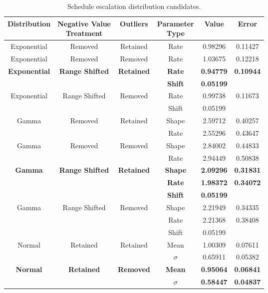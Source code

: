 \documentclass{article}
\begin{document}
\begin{adjustwidth}{-1cm}{-1cm}
\begin{center}
\begin{table}[!htbp]
\caption{Schedule escalation distribution candidates.} \vspace{3 mm}
\begin{tabular} {| c | c | c | c | c | c |} \hline
  Distribution & \makecell{Negative Value \\ Treatment} & Outliers & \makecell{Parameter \\ Type} & Value & Error \\  \hline
  Exponential & Removed & Retained & Rate & 0.98296 & 0.11427 \\ \hline
  Exponential & Removed & Removed & Rate & 1.03675 & 0.12218 \\ \hline
  \textbf{Exponential} & \textbf{Range Shifted} & \textbf{Retained} & \textbf{Rate} & \textbf{0.94779} & \textbf{0.10944} \\ \hline
   & & & \textbf{Shift} & \textbf{0.05199} & \\ \hline
  Exponential & Range Shifted & Removed & Rate & 0.99738 & 0.11673 \\ \hline
   & & & Shift & 0.05199 & \\ \hline
  Gamma & Removed & Retained & Shape & 2.59712 & 0.40257 \\ \hline
   & & & Rate & 2.55296 & 0.43647 \\ \hline
  Gamma & Removed & Removed & Shape & 2.84002 & 0.44833 \\ \hline
   & & & Rate & 2.94449 & 0.50838 \\ \hline
  \textbf{Gamma} & \textbf{Range Shifted} & \textbf{Retained} & \textbf{Shape} & \textbf{2.09296} & \textbf{0.31831} \\ \hline
   & & & \textbf{Rate} & \textbf{1.98372} & \textbf{0.34072} \\ \hline
   & & & \textbf{Shift} & \textbf{0.05199} & \\ \hline
  Gamma & Range Shifted & Removed & Shape & 2.21949 & 0.34335 \\ \hline
   & & & Rate & 2.21368 & 0.38408 \\ \hline
   & & & Shift & 0.05199 & \\ \hline
  Normal & Retained & Retained & Mean & 1.00309 & 0.07611 \\ \hline
   & & & $\sigma$ & 0.65911 & 0.05382 \\ \hline
  \textbf{Normal} & \textbf{Retained} & \textbf{Removed} & \textbf{Mean} & \textbf{0.95064} & \textbf{0.06841} \\ \hline
   & & & \textbf{$\sigma$} & \textbf{0.58447} & \textbf{0.04837} \\ \hline
\end{tabular}
\label{sesc}
\end{table}
\end{center}
\end{adjustwidth}
\end{document}
